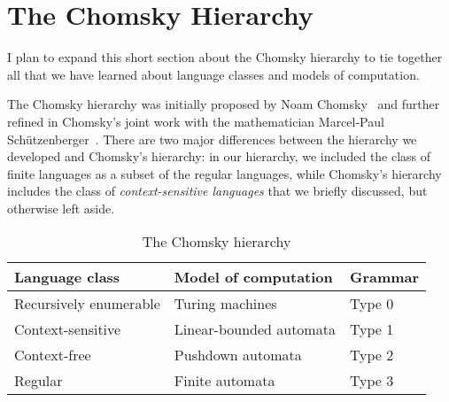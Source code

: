 \section{The Chomsky Hierarchy}\label{sec:chomskyhierarchy}

\begin{construction}
I plan to expand this short section about the Chomsky hierarchy to tie together all that we have learned about language classes and models of computation.
\end{construction}

The Chomsky hierarchy was initially proposed by Noam Chomsky~\citeyearpar{Chomsky1956ThreeModels, Chomsky1959FormalPropertiesGrammars} and further refined in Chomsky's joint work with the mathematician Marcel-Paul Sch\"{u}tzenberger~\citeyearpar{ChomskySchutzenberger1963ContextFree}. There are two major differences between the hierarchy we developed and Chomsky's hierarchy: in our hierarchy, we included the class of finite languages as a subset of the regular languages, while Chomsky's hierarchy includes the class of \emph{context-sensitive languages} that we briefly discussed, but otherwise left aside.

\begin{table}
\centering
\caption{The Chomsky hierarchy}
\label{tab:chomskyhierarchy}
\begin{tabular}{l l l}
\toprule
\textbf{Language class}	& \textbf{Model of computation}		& \textbf{Grammar} \\
\midrule
Recursively enumerable	& Turing machines				& Type 0 \\
Context-sensitive		& Linear-bounded automata		& Type 1 \\
Context-free			& Pushdown automata			& Type 2 \\
Regular				& Finite automata				& Type 3 \\
\bottomrule
\end{tabular}
\end{table}

